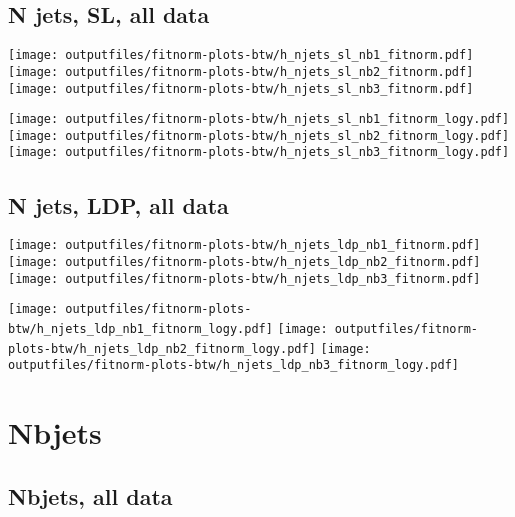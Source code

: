 \documentclass[11pt]{article}
\begin{document}
    \subsection{ N jets, SL, all data}

    \noindent
     \texttt{[image: outputfiles/fitnorm-plots-btw/h\_njets\_sl\_nb1\_fitnorm.pdf]}
     \texttt{[image: outputfiles/fitnorm-plots-btw/h\_njets\_sl\_nb2\_fitnorm.pdf]}
     \texttt{[image: outputfiles/fitnorm-plots-btw/h\_njets\_sl\_nb3\_fitnorm.pdf]}

    \noindent
     \texttt{[image: outputfiles/fitnorm-plots-btw/h\_njets\_sl\_nb1\_fitnorm\_logy.pdf]}
     \texttt{[image: outputfiles/fitnorm-plots-btw/h\_njets\_sl\_nb2\_fitnorm\_logy.pdf]}
     \texttt{[image: outputfiles/fitnorm-plots-btw/h\_njets\_sl\_nb3\_fitnorm\_logy.pdf]}

   \clearpage

    \subsection{ N jets, LDP, all data}

    \noindent
     \texttt{[image: outputfiles/fitnorm-plots-btw/h\_njets\_ldp\_nb1\_fitnorm.pdf]}
     \texttt{[image: outputfiles/fitnorm-plots-btw/h\_njets\_ldp\_nb2\_fitnorm.pdf]}
     \texttt{[image: outputfiles/fitnorm-plots-btw/h\_njets\_ldp\_nb3\_fitnorm.pdf]}

    \noindent
     \texttt{[image: outputfiles/fitnorm-plots-btw/h\_njets\_ldp\_nb1\_fitnorm\_logy.pdf]}
     \texttt{[image: outputfiles/fitnorm-plots-btw/h\_njets\_ldp\_nb2\_fitnorm\_logy.pdf]}
     \texttt{[image: outputfiles/fitnorm-plots-btw/h\_njets\_ldp\_nb3\_fitnorm\_logy.pdf]}

   \clearpage




    \clearpage
    \section{Nbjets}

    \subsection{ Nbjets, all data}
\end{document}

